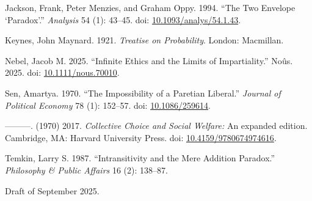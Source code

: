 \documentclass[
  11pt,
  letterpaper,
  DIV=11,
  numbers=noendperiod,
  twoside]{scrartcl}
\newlength{\cslhangindent}
\newenvironment{CSLReferences}[2] %
 {\begin{list}{}{%
  \setlength{\itemindent}{0pt}
  \setlength{\leftmargin}{0pt}
  \setlength{\parsep}{0pt}
  \ifodd #1
   \setlength{\leftmargin}{\cslhangindent}
   \setlength{\itemindent}{-1\cslhangindent}
  \fi
  \setlength{\itemsep}{#2\baselineskip}}}
 {\end{list}}
\begin{document}
\begin{CSLReferences}{1}{0}
Jackson, Frank, Peter Menzies, and Graham Oppy. 1994. {``The Two
Envelope {`Paradox'}.''} \emph{Analysis} 54 (1): 43--45. doi:
\href{https://doi.org/10.1093/analys/54.1.43}{10.1093/analys/54.1.43}.

Keynes, John Maynard. 1921. \emph{Treatise on Probability}. London:
Macmillan.

Nebel, Jacob M. 2025. {``Infinite Ethics and the Limits of
Impartiality.''} No{û}s. 2025. doi:
\href{https://doi.org/10.1111/nous.70010}{10.1111/nous.70010}.

Sen, Amartya. 1970. {``The Impossibility of a Paretian Liberal.''}
\emph{Journal of Political Economy} 78 (1): 152--57. doi:
\href{https://doi.org/10.1086/259614}{10.1086/259614}.

---------. (1970) 2017. \emph{Collective Choice and Social Welfare:} An
expanded edition. Cambridge, MA: Harvard University Press. doi:
\href{https://doi.org/10.4159/9780674974616}{10.4159/9780674974616}.

Temkin, Larry S. 1987. {``Intransitivity and the Mere Addition
Paradox.''} \emph{Philosophy \& Public Affairs} 16 (2): 138--87.

\end{CSLReferences}



Draft of September 2025.
\end{document}
